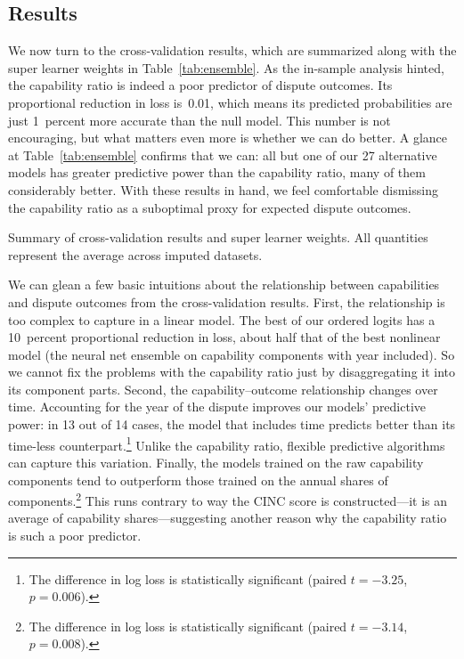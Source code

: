 \subsection{Results}

We now turn to the cross-validation results, which are summarized along with the super learner weights in Table~\ref{tab:ensemble}.
As the in-sample analysis hinted, the capability ratio is indeed a poor predictor of dispute outcomes.
Its proportional reduction in loss is~0.01, which means its predicted probabilities are just 1~percent more accurate than the null model.
This number is not encouraging, but what matters even more is whether we can do better.
A glance at Table~\ref{tab:ensemble} confirms that we can: all but one of our 27 alternative models has greater predictive power than the capability ratio, many of them considerably better.
With these results in hand, we feel comfortable dismissing the capability ratio as a suboptimal proxy for expected dispute outcomes.

\begin{table}[tp]
  \centering
  
  \caption{
    Summary of cross-validation results and super learner weights.
    All quantities represent the average across imputed datasets.
  }
  \label{tab:ensemble}
\end{table}

We can glean a few basic intuitions about the relationship between capabilities and dispute outcomes from the cross-validation results.
First, the relationship is too complex to capture in a linear model.
The best of our ordered logits has a 10~percent proportional reduction in loss, about half that of the best nonlinear model (the neural net ensemble on capability components with year included).
So we cannot fix the problems with the capability ratio just by disaggregating it into its component parts.
Second, the capability--outcome relationship changes over time.
Accounting for the year of the dispute improves our models' predictive power: in 13 out of 14 cases, the model that includes time predicts better than its time-less counterpart.\footnote{
  The difference in log loss is statistically significant (paired $t = -3.25$, $p = 0.006$).
}
Unlike the capability ratio, flexible predictive algorithms can capture this variation.
Finally, the models trained on the raw capability components tend to outperform those trained on the annual shares of components.\footnote{
  The difference in log loss is statistically significant (paired $t = -3.14$, $p = 0.008$).
}
This runs contrary to way the CINC score is constructed---it is an average of capability shares---suggesting another reason why the capability ratio is such a poor predictor.


